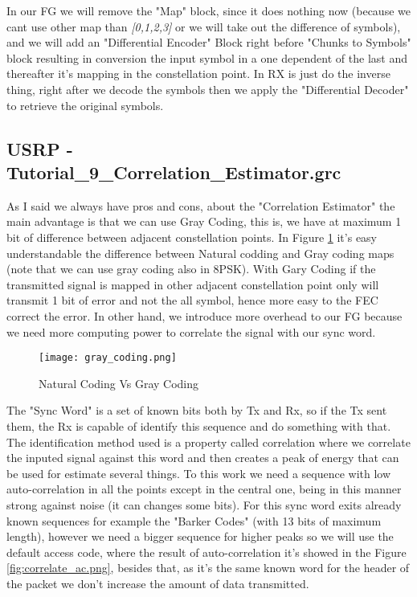 \documentclass[a4paper, 10pt, conference]{ieeeconf}      %
\begin{document}
    In our FG we will remove the "Map" block, since it does nothing now (because we cant use other map than \textit{[0,1,2,3]} or we will take out the difference of symbols), and we will add an "Differential Encoder" Block right before "Chunks to Symbols" block resulting in conversion the input symbol in a one dependent of the last and thereafter it's mapping in the constellation point. 
    In RX is just do the inverse thing, right after we decode the symbols then we apply the "Differential Decoder" to retrieve the original symbols.
    
\subsection{USRP - Tutorial\_9\_Correlation\_Estimator.grc}
    As I said we always have pros and cons, about the "Correlation Estimator" the main advantage is that we can use Gray Coding, this is, we have at maximum 1 bit of difference between adjacent constellation points. In Figure \ref{fig:gray_coding.png} it's easy understandable the difference between Natural codding and Gray coding maps (note that we can use gray coding also in 8PSK). With Gary Coding if the transmitted signal is mapped in other adjacent constellation point only will transmit 1 bit of error and not the all symbol, hence more easy to the FEC correct the error. In other hand, we introduce more overhead to our FG because we need more computing power to correlate the signal with our sync word.

    \begin{figure}
        \centering
        \texttt{[image: gray\_coding.png]}
        \caption{Natural Coding Vs Gray Coding}
        \label{fig:gray_coding.png}
    \end{figure}
    
    
    The "Sync Word" is a set of known bits both by Tx and Rx, so if the Tx sent them, the Rx is capable of identify this sequence and do something with that. The identification method used is a property called correlation where we correlate the inputed signal against this word and then creates a peak of energy that can be used for estimate several things. To this work we need a sequence with low auto-correlation in all the points except in the central one, being in this manner strong against noise (it can changes some bits). For this sync word exits already known sequences for example the "Barker Codes" (with 13 bits of maximum length), however we need a bigger sequence for higher peaks so we will use the default access code, where the result of auto-correlation it's showed in the Figure \ref{fig:correlate_ac.png}, besides that, as it's the same known word for the header of the packet we don't increase the amount of data transmitted.
    
\end{document}
